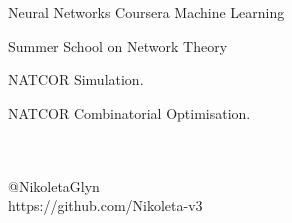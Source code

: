 \documentclass{beamer}
\begin{document}
\begin{frame}
\centering
\Huge Neural Networks
\vfill
\large Coursera Machine Learning
\end{frame}

\begin{frame}
\centering

\end{frame}

\begin{frame}
\centering

\end{frame}


\begin{frame}
    \begin{center}
\begin{todolist}
  \item Summer School on Network Theory
  \item NATCOR Simulation.
  \item NATCOR Combinatorial Optimisation.
\end{todolist}
    \end{center}
\end{frame}

\begin{frame}
	\begin{center}
		\huge{\textbf{}}\\~\\
		\small{@NikoletaGlyn}\\
		\small{https://github.com/Nikoleta-v3}\\
	\end{center}
\end{frame}
\end{document}
